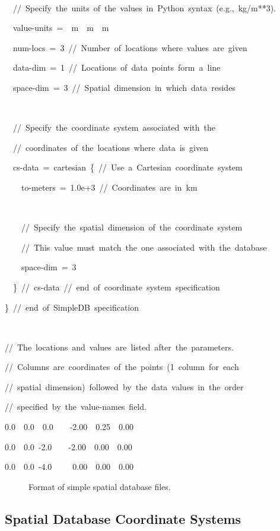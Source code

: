 \begin{lyxcode}
~

~~//~Specify~the~units~of~the~values~in~Python~syntax~(e.g.,~kg/m{*}{*}3).

~~value-units~=~~m~~m~~m



~~num-locs~=~3~//~Number~of~locations~where~values~are~given

~~data-dim~=~1~//~Locations~of~data~points~form~a~line

~~space-dim~=~3~//~Spatial~dimension~in~which~data~resides

~

~~//~Specify~the~coordinate~system~associated~with~the~

~~//~coordinates~of~the~locations~where~data~is~given

~~cs-data~=~cartesian~\{~//~Use~a~Cartesian~coordinate~system

~~~~to-meters~=~1.0e+3~//~Coordinates~are~in~km

~

~~~~//~Specify~the~spatial~dimension~of~the~coordinate~system

~~~~//~This~value~must~match~the~one~associated~with~the~database

~~~~space-dim~=~3

~~\}~//~cs-data~//~end~of~coordinate~system~specification

\}~//~end~of~SimpleDB~specification

~

//~The~locations~and~values~are~listed~after~the~parameters.

//~Columns~are~coordinates~of~the~points~(1~column~for~each~

//~spatial~dimension)~followed~by~the~data~values~in~the~order~

//~specified~by~the~value-names~field.

0.0~~0.0~~0.0~~~~-2.00~~0.25~~0.00

0.0~~0.0~-2.0~~~~-2.00~~0.00~~0.00

0.0~~0.0~-4.0~~~~~0.00~~0.00~~0.00
\end{lyxcode}
\begin{figure}[H]
\caption{Format of simple spatial database files.}
\end{figure}



\subsection{Spatial Database Coordinate Systems}

